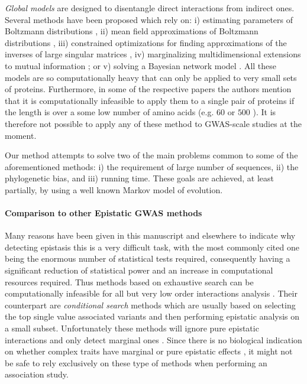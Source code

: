 \textit{Global models} are designed to disentangle direct interactions from indirect ones. 
Several methods have been proposed which rely on: 
i) estimating parameters of Boltzmann distributions \cite{lapedes2012using,weigt2009identification}, 
ii) mean field approximations of Boltzmann distributions \cite{morcos2011direct}, 
iii) constrained optimizations for finding approximations of the inverses of large singular matrices \cite{jones2012psicov}, 
iv) marginalizing multidimensional extensions to mutual information \cite{clark2014multidimensional}; or 
v) solving a Bayesian network model \cite{burger2010disentangling}. 
All these models are so computationally heavy that can only be applied to very small sets of proteins. 
Furthermore, in some of the respective papers the authors mention that it is computationally infeasible to apply them to a single pair of proteins if the length is over a some low number of amino acids (e.g. $60$ \cite{weigt2009identification} or $500$ \cite{morcos2011direct}). 
It is therefore not possible to apply any of these method to GWAS-scale studies at the moment.

Our method attempts to solve two of the main problems common to some of the aforementioned methods: 
i) the requirement of large number of sequences, 
ii) the phylogenetic bias, and
iii) running time.
These goals are achieved, at least partially, by using a well known Markov model of evolution.

\paragraph{Comparison to other Epistatic GWAS methods}
Many reasons have been given in this manuscript and elsewhere to indicate why detecting epistasis this is a very difficult task, with the most commonly cited one being the enormous number of statistical tests required, consequently having a significant reduction of statistical power and an increase in computational resources required.
Thus methods based on exhaustive search can be computationally infeasible for all but very low order interactions analysis \cite{cordell2009detecting}.
Their counterpart are \textit{conditional search} methods \cite{li2011detecting} which are usually based on selecting the top single value associated variants and then performing epistatic analysis on a small subset.
Unfortunately these methods will ignore pure epistatic interactions and only detect marginal ones \cite{li2011detecting,cordell2002epistasis}.
Since there is no biological indication on whether complex traits have marginal or pure epistatic effects \cite{culverhouse2002perspective,zuk2012mystery,li2011detecting}, it might not be safe to rely exclusively on these type of methods when performing an  association study.

